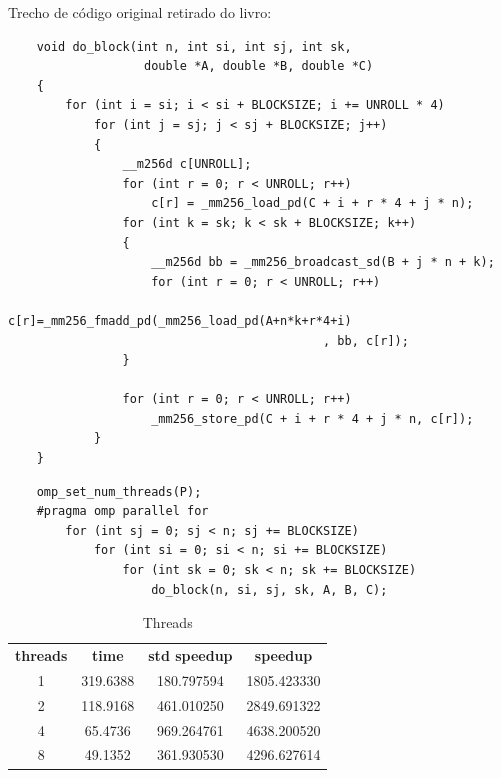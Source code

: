 \documentclass[12pt]{article}
\begin{document}
Trecho de código original retirado do livro:

\begin{lstlisting}
    void do_block(int n, int si, int sj, int sk,
                   double *A, double *B, double *C)
    {
        for (int i = si; i < si + BLOCKSIZE; i += UNROLL * 4)
            for (int j = sj; j < sj + BLOCKSIZE; j++)
            {
                __m256d c[UNROLL];
                for (int r = 0; r < UNROLL; r++)
                    c[r] = _mm256_load_pd(C + i + r * 4 + j * n);
                for (int k = sk; k < sk + BLOCKSIZE; k++)
                {
                    __m256d bb = _mm256_broadcast_sd(B + j * n + k);
                    for (int r = 0; r < UNROLL; r++)
                        c[r]=_mm256_fmadd_pd(_mm256_load_pd(A+n*k+r*4+i)
                                            , bb, c[r]);
                }
    
                for (int r = 0; r < UNROLL; r++)
                    _mm256_store_pd(C + i + r * 4 + j * n, c[r]);
            }
    }
\end{lstlisting}

\begin{lstlisting}
    omp_set_num_threads(P);
    #pragma omp parallel for
        for (int sj = 0; sj < n; sj += BLOCKSIZE)
            for (int si = 0; si < n; si += BLOCKSIZE)
                for (int sk = 0; sk < n; sk += BLOCKSIZE)
                    do_block(n, si, sj, sk, A, B, C);
\end{lstlisting}

\begin{table}[h]
    \centering
    \label{tab:threads}
    \begin{tabular}{cccc}
        \textbf{threads} & \textbf{time} & \textbf{std speedup} & \textbf{speedup} \\
        1 & 319.6388 & 180.797594 & 1805.423330 \\
        2 & 118.9168 & 461.010250	& 2849.691322 \\
        4 & 65.4736 & 969.264761	& 4638.200520 \\
        8 & 49.1352	 & 	361.930530	& 4296.627614 \\
    \end{tabular}
    \caption{Threads}
\end{table}
\end{document}
